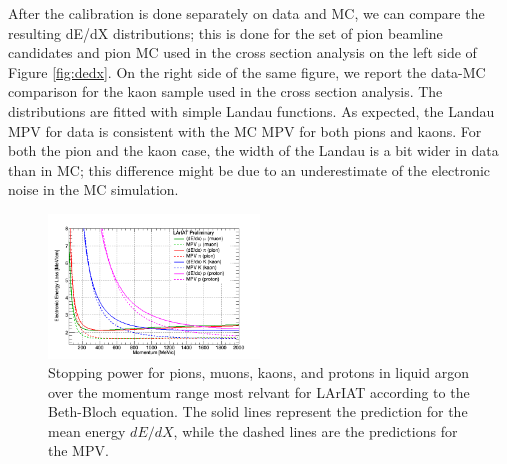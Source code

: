 After the calibration is done separately on data and MC, we can compare the resulting dE/dX distributions; this is done for the set of pion beamline candidates and pion MC used in the cross section analysis on the left side of Figure \ref{fig:dedx}. On the right side of the same figure, we report the data-MC comparison for the kaon sample used in the cross section analysis. The distributions are fitted with simple Landau functions. As expected, the Landau MPV for data  is consistent with the MC MPV for both pions and kaons. For both the pion and the kaon case, the width of the Landau is a bit wider in data than in MC; this difference might be due to an underestimate of the electronic noise in the MC simulation.


\begin{figure}[htb]
\centering
\includegraphics[width=0.50\textwidth]{Chapter-5/Images/dEdXvsMomentumTemplate.png}
\caption{Stopping power for pions, muons, kaons, and protons in liquid argon over the momentum range most relvant for LArIAT according to the Beth-Bloch equation. The solid lines represent the prediction for the mean energy $dE/dX$, while the dashed lines are the predictions for the MPV.}
\label{fig:PDGEnergyLossArgon}
\end{figure}


